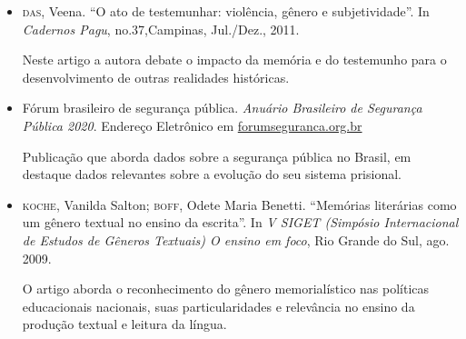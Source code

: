 \documentclass[11pt]{extarticle}
\begin{document}
\begin{itemize}



\item\textsc{das}, Veena. ``O ato de testemunhar: violência, gênero e subjetividade''. In
\emph{Cadernos Pagu}, no.37,Campinas, Jul./Dez., 2011. 

Neste artigo a autora debate o impacto da memória e do testemunho para o desenvolvimento 
de outras realidades históricas.

\item Fórum brasileiro de
segurança pública. \textit{Anuário Brasileiro de Segurança Pública 2020}. Endereço Eletrônico em
\href{https://forumseguranca.org.br/wp-content/uploads/2020/10/anuario-14-2020-v1-interativo.pdf}{forumseguranca.org.br} 

Publicação que aborda dados sobre a segurança pública no Brasil, em
destaque dados relevantes sobre a evolução do seu sistema prisional.




\item\textsc{koche}, Vanilda Salton; \textsc{boff}, Odete Maria Benetti. ``Memórias literárias
como um gênero textual no ensino da escrita''. In \emph{V SIGET (Simpósio
Internacional de Estudos de Gêneros Textuais) O ensino em foco}, Rio
Grande do Sul, ago. 2009. 

O artigo aborda o reconhecimento do gênero memorialístico nas políticas educacionais 
nacionais, suas particularidades e relevância no ensino da produção textual e leitura 
da língua.




\end{itemize}
\end{document}
